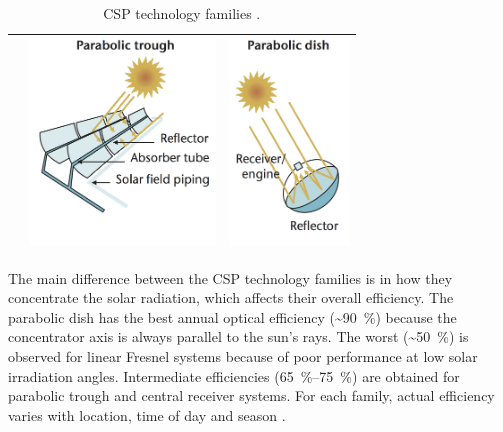 \begin{table}[h!]
\begin{tabular}{  m{5cm}  m{5cm}  m{5cm}  }
    &
    \begin{minipage}{5cm}
      \centering
	  \includegraphics[height=55mm]{FIG/SUM/PT}
    \end{minipage}
    & 
    \begin{minipage}{5cm}
      \centering
	  \includegraphics[height=55mm]{FIG/SUM/PD}
    \end{minipage}    
    \\ \hline
  \end{tabular}
  \caption[CSP technology families.]{CSP technology families \cite{IEA2014c}.}\label{tbl: CSPtech}
\end{table}


The main difference between the CSP technology families is in how they concentrate the solar radiation, which affects their overall efficiency. The parabolic dish has the best annual optical efficiency (\sim\SI{90}{\percent}) because the concentrator axis is always parallel to the sun's rays. The worst (\sim\SI{50}{\percent}) is observed for linear Fresnel systems because of poor performance at low solar irradiation angles. Intermediate efficiencies (\SIrange{65}{75}{\percent}) are obtained for parabolic trough and central receiver systems. For each family, actual efficiency varies with location, time of day and season \cite{EASAC2011}.

